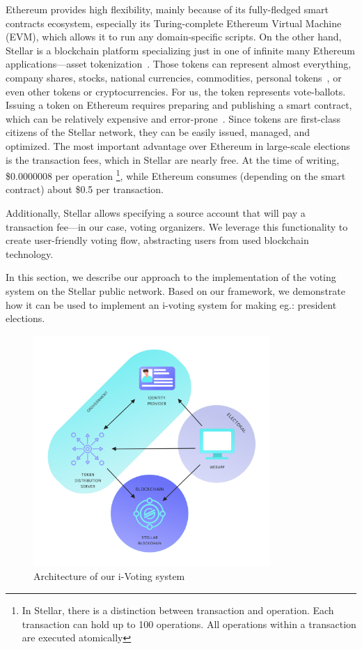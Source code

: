 \documentclass[applsci,article,submit,moreauthors,pdftex]{Definitions/mdpi}
\begin{document}
Ethereum provides high flexibility, mainly because of its fully-fledged smart contracts ecosystem, especially its Turing-complete Ethereum Virtual Machine (EVM), which allows it to run any domain-specific scripts. 
On the other hand, Stellar is a blockchain platform specializing just in one of infinite many Ethereum applications––asset tokenization~\cite{li2019tokenization}. Those tokens can represent almost everything, company shares, stocks, national currencies, commodities, personal tokens~\cite{Personal27:online}, or even other tokens or cryptocurrencies. For us, the token represents vote-ballots. 
Issuing a token on Ethereum requires preparing and publishing a smart contract, which can be relatively expensive and error-prone~\cite{Analysis57:online}.
Since tokens are first-class citizens of the Stellar network, they can be easily issued, managed, and optimized. The most important advantage over Ethereum in large-scale elections is the transaction fees, which in Stellar are nearly free. At the time of writing, \$0.0000008 per operation \footnote{In Stellar, there is a distinction between transaction and operation. Each transaction can hold up to 100 operations. All operations within a transaction are executed atomically}, while Ethereum consumes (depending on the smart contract) about \$0.5 per transaction. 

Additionally, Stellar allows specifying a source account that will pay a transaction fee––in our case, voting organizers. We leverage this functionality to create user-friendly voting flow, abstracting users from used blockchain technology.

In this section, we describe our approach to the implementation of the voting system on the Stellar public network. Based on our framework, we demonstrate how it can be used to implement an i-voting system
for making eg.: president elections. %

\begin{figure}[h!]
\includegraphics[width=9cm]{figs/stellot-architecture.png}
\centering
\caption{Architecture of our i-Voting system}
\label{fig:architecture}
\end{figure} 
\end{document}
